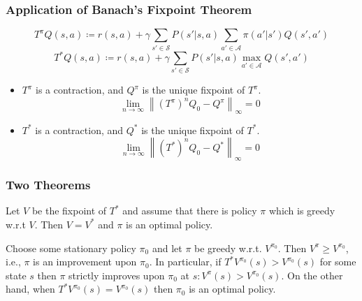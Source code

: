 \documentclass[UTF8,11pt,colorlinks,compress,openany]{beamer}%
\begin{document}
\begin{frame}\frametitle{Application of Banach's Fixpoint Theorem}
\setlength\abovedisplayskip{0pt}
\setlength\belowdisplayskip{0pt}
	\begin{block}{}
		\[T^\pi Q(s,a)\coloneqq r(s,a)+\gamma\sum\limits_{s'\in\mathcal{S}}P(s'|s,a)\sum\limits_{a'\in\mathcal{A}}\pi(a'|s')Q(s',a')\]
		\[T^* Q(s,a)\coloneqq r(s,a)+\gamma\sum\limits_{s'\in\mathcal{S}}P(s'|s,a)\max\limits_{a'\in\mathcal{A}}Q(s',a')\]
		\begin{itemize}
			\item $T^\pi$ is a contraction, and $Q^\pi$ is the unique fixpoint of $T^\pi$.
			\[\lim\limits_{n\to\infty}\left\|(T^\pi)^nQ_0-Q^\pi\right\|_\infty=0\]
			\item $T^*$ is a contraction, and $Q^*$ is the unique fixpoint of $T^*$.
			\[\lim\limits_{n\to\infty}\left\|(T^*)^nQ_0-Q^*\right\|_\infty=0\]
		\end{itemize}
	\end{block}
\end{frame}

\begin{frame}\frametitle{Two Theorems}
	\begin{theorem}
		Let $V$ be the fixpoint of $T^*$ and assume that there is policy $\pi$ which is greedy w.r.t $V$. Then $V=V^*$ and $\pi$ is an optimal policy.
	\end{theorem}
	\begin{theorem}
		Choose some stationary policy $\pi_0$ and let $\pi$ be
		greedy w.r.t. $V^{\pi_0}$. Then $V^\pi\geq V^{\pi_0}$, i.e., $\pi$ is an improvement upon $\pi_0$. In particular, if $T^*V^{\pi_0}(s)>V^{\pi_0}(s)$ for some state $s$ then $\pi$ strictly improves upon $\pi_0$ at $s: V^\pi(s)>V^{\pi_0}(s)$. On the other hand, when $T^*V^{\pi_0}(s)=V^{\pi_0}(s)$ then $\pi_0$ is an optimal policy.
	\end{theorem}
\end{frame}
\end{document}
